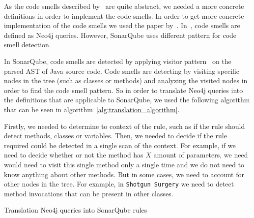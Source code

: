 As the code smells described by~\citeauthor{refactoring-fowler} are quite abstract, we needed
a more concrete definitions in order to implement the code smells.
In order to get more concrete implementation of the code smells we used the paper by~\citeauthor{ios_code_smell_paper}.
In~\cite{ios_code_smell_paper}, code smells are defined as Neo4j queries.
However, SonarQube uses different pattern for code smell detection.

In SonarQube, code smells are detected by applying visitor pattern~\cite{visitor_pattern} on the parsed
AST of Java source code.
Code smells are detecting by visiting specific nodes in the tree (such as classes or methods) and analyzing
the visited nodes in order to find the code smell pattern.
So in order to translate Neo4j queries into the definitions that are applicable to SonarQube, we used the following
algorithm that can be seen in algorithm~\ref{alg:translation_algorithm}.

Firstly, we needed to determine to context of the rule, such as if the rule should detect methods, classes or variables.
Then, we needed to decide if the rule required could be detected in a single scan of the context.
For example, if we need to decide whether or not the method has $X$ amount of parameters, we need would need to visit
this single method only a single time and we do not need to know anything about other methods.
But in some cases, we need to account for other nodes in the tree.
For example, in \verb|Shotgun Surgery| we need to detect method invocations that can be present in other classes.

\begin{algorithm} [!htb]
    \caption{Translation Neo4j queries into SonarQube rules}
    \label{alg:translation_algorithm}
    \BlankLine

\end{algorithm}

